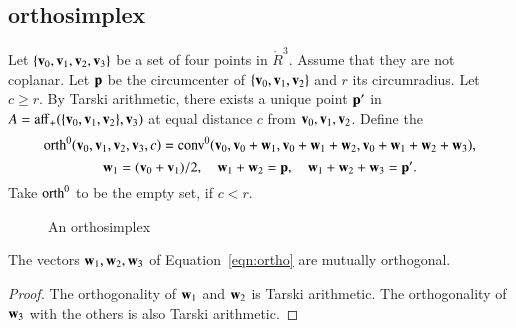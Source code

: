 \subsection{orthosimplex}
%



\begin{definition}[orth] 
Let $\{{\mathbf v}_0,{\mathbf v}_1,{\mathbf v}_2,{\mathbf v}_3\}$ be a set of four points in $\ring{R}^3$.
Assume that they are not coplanar.  Let ${\mathbf p}$ be the circumcenter
of $\{{\mathbf v}_0,{\mathbf v}_1,{\mathbf v}_2\}$ and $r$ its circumradius.  Let $c\ge r$.
By Tarski arithmetic, %
there exists a unique point ${\mathbf p}'$ in $A={\operatorname{aff}}_+(\{{\mathbf v}_0,{\mathbf v}_1,{\mathbf v}_2\},{\mathbf v}_3)$ at equal distance $c$
from ${\mathbf v}_0,{\mathbf v}_1,{\mathbf v}_2$.  Define the 
%
%
$$
    {\operatorname{orth}}^0({\mathbf v}_0,{\mathbf v}_1,{\mathbf v}_2,{\mathbf v}_3,c) = 
   {\operatorname{conv}}^0({\mathbf v}_0,{\mathbf v}_0+{\mathbf w}_1,{\mathbf v}_0+{\mathbf w}_1+{\mathbf w}_2,{\mathbf v}_0+{\mathbf w}_1+{\mathbf w}_2+{\mathbf w}_3),
$$
\begin{equation}\label{eqn:ortho}
     {\mathbf w}_1=({\mathbf v}_0+{\mathbf v}_1)/2,\quad {\mathbf w}_1+{\mathbf w}_2={\mathbf p},\quad {\mathbf w}_1+{\mathbf w}_2+{\mathbf w}_3={\mathbf p}'.
\end{equation}
Take ${\operatorname{orth}}^0$ to be the empty set, if $c< r$.
%
\end{definition}


\begin{figure}[htb]
  \centering
  \caption{An orthosimplex}
\end{figure}


\begin{lemma} The vectors ${\mathbf w}_1,{\mathbf w}_2,{\mathbf w}_3$ of Equation~\ref{eqn:ortho}
are mutually orthogonal.
%
\end{lemma}

\begin{proof} The orthogonality of ${\mathbf w}_1$ and ${\mathbf w}_2$ is 
Tarski arithmetic. %
The orthogonality of ${\mathbf w}_3$ with the others is also Tarski arithmetic. %
\end{proof}
%

